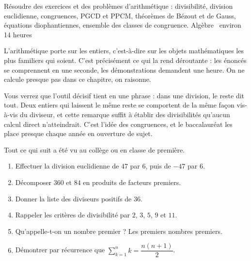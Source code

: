   {Résoudre des exercices et des problèmes d'arithmétique : divisibilité,
   division euclidienne, congruences, PGCD et PPCM, théorèmes de Bézout et de
   Gauss, équations diophantiennes, ensemble des classes de congruence.}
  {Algèbre \textbullet\ environ 14 heures}

L'arithmétique porte sur les entiers, c'est-à-dire sur les objets
mathématiques les plus familiers qui soient. C'est précisément ce qui la rend
déroutante : les énoncés se comprennent en une seconde, les démonstrations
demandent une heure. On ne calcule presque pas dans ce chapitre, on raisonne.

Vous verrez que l'outil décisif tient en une phrase : dans une division, le
reste dit tout. Deux entiers qui laissent le même reste se comportent de la
même façon vis-à-vis du diviseur, et cette remarque suffit à établir des
divisibilités qu'aucun calcul direct n'atteindrait. C'est l'idée des
congruences, et le baccalauréat les place presque chaque année en ouverture de
sujet.

\begin{revision}
Tout ce qui suit a été vu au collège ou en classe de première.

\begin{enumerate}[label=\textbf{\arabic*.}, leftmargin=*, itemsep=0.35em]
  \item Effectuer la division euclidienne de $47$ par $6$, puis de $-47$ par
        $6$.
  \item Décomposer $360$ et $84$ en produits de facteurs premiers.
  \item Donner la liste des diviseurs positifs de $36$.
  \item Rappeler les critères de divisibilité par $2$, $3$, $5$, $9$ et $11$.
  \item Qu'appelle-t-on un nombre premier ? Les premiers nombres premiers.
  \item Démontrer par récurrence que $\displaystyle\sum_{k=1}^{n}k
        = \dfrac{n(n+1)}{2}$.
\end{enumerate}
\end{revision}

